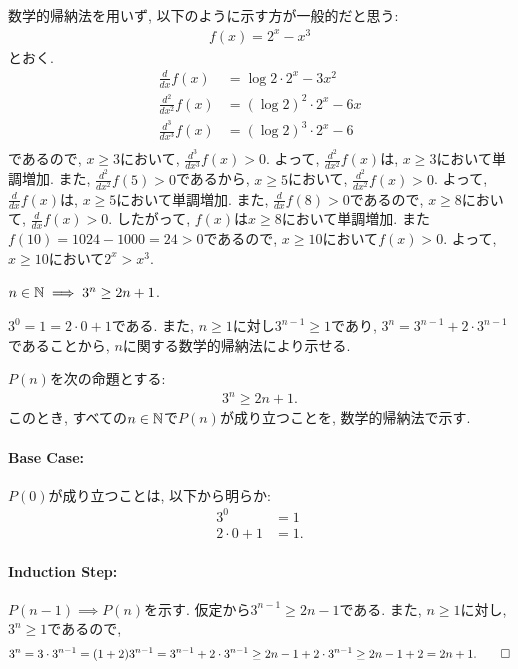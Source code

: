 \begin{rem}
  数学的帰納法を用いず, 以下のように示す方が一般的だと思う:
  \begin{align*}
    f(x)=2^x-x^3
  \end{align*}
  とおく.
  \begin{align*}
    \frac{d}{dx}f(x)&=\log 2 \cdot 2^x-3x^2\\
    \frac{d^2}{dx^2}f(x)&=(\log 2)^2 \cdot 2^x-6x\\
    \frac{d^3}{dx^3}f(x)&=(\log 2)^3 \cdot 2^x-6\\
  \end{align*}
  であるので,
  $x\geq 3$において,
  $\frac{d^3}{dx^3}f(x)>0$.
  よって, 
  $\frac{d^2}{dx^2}f(x)$は,
  $x\geq 3$において単調増加.
  また,
  $\frac{d^2}{dx^2}f(5)>0$であるから,
  $x\geq 5$において,
  $\frac{d^2}{dx^2}f(x)>0$.
  よって, 
  $\frac{d}{dx}f(x)$は,
  $x\geq 5$において単調増加.  
  また, $\frac{d}{dx}f(8)>0$であるので,
  $x\geq 8$において,
  $\frac{d}{dx}f(x)> 0$.
  したがって, $f(x)$は$x\geq 8$において単調増加.
  また$f(10)=1024-1000=24>0$であるので,
  $x\geq 10$において$f(x) > 0$.
  よって, $x\geq 10$において$2^x > x^3$.
\end{rem}


\begin{prop}
  \label{p:20230819}
  $n\in\mathbb{N} \implies 3^n \geq 2n+1$.
\end{prop}
\begin{proof**}
  $3^{0}=1= 2\cdot 0+1$である.
  また, 
  $n\geq 1$に対し$3^{n-1}\geq 1$であり,
  $3^n=3^{n-1}+2\cdot 3^{n-1}$であることから,
  $n$に関する数学的帰納法により示せる.
\end{proof**}
\begin{proof*}
  $P(n)$を次の命題とする:
  \begin{align*}
    3^n \geq 2n+1
    .
  \end{align*}
  このとき,
  すべての$n\in\mathbb{N}$で$P(n)$が成り立つことを,
  数学的帰納法で示す.

  \paragraph{Base Case:}
  $P(0)$が成り立つことは, 以下から明らか:
  \begin{align*}
    3^{0}&=1\\
     2\cdot 0+1&=1.
  \end{align*}
  \paragraph{Induction Step:}
  $P(n-1)\implies P(n)$を示す.
  仮定から$3^{n-1} \geq 2n-1$である.
  また, 
  $n\geq 1$に対し, $3^n\geq 1$であるので,
  \begin{align*}
    3^n=3\cdot 3^{n-1}=(1+2)3^{n-1}=3^{n-1}+2\cdot 3^{n-1}\geq 2n-1+2\cdot 3^{n-1}\geq 2n-1+2=2n+1
    .\qedhere
  \end{align*}
\end{proof*}

